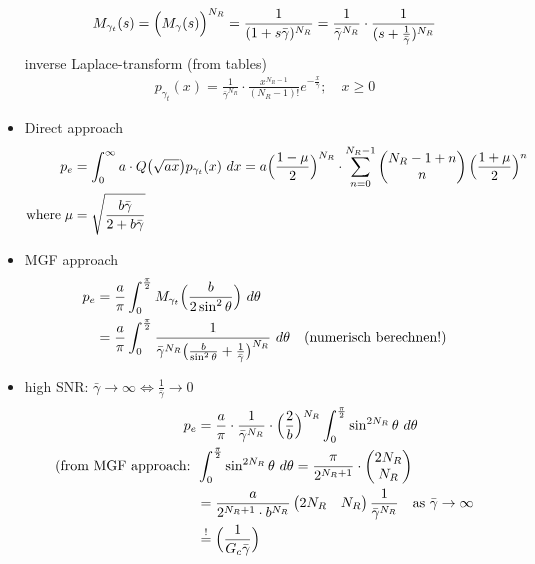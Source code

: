 \documentclass[a4paper, 10pt]{article}
\begin{document}
\begin{itemize}
			\begin{align*}
				M_{\gamma _t}(s) = \Bigl (M_\gamma (s)\Bigr )^{N_R} = \frac{1}{(1 + s\bar{\gamma})^{N_R}} = \frac{1}{\bar{\gamma}^{N_R}}\cdot \frac{1}{(s + \frac{1}{\bar{\gamma}})^{N_R}}
			\end{align*}
			inverse Laplace-transform (from tables)
			\begin{align*}
				p_{\gamma _t}(x) = \frac{1}{\bar{\gamma}^{N_R}}\cdot \frac{x^{N_R-1}}{(N_R - 1)!}e^{-\frac{x}{\bar{\gamma}}};\quad x\geq 0
			\end{align*}
	\item Direct approach 
		\begin{align*}
			p_e &= \int_{0}^{\infty}a\cdot Q\bigl (\sqrt{ax} \bigr )p_{\gamma _t}(x)~dx = a\Bigl (\frac{1 - \mu}{2}\Bigr )^{N_R} \cdot \sum_{n = 0}^{N_R - 1}\begin{pmatrix} N_R - 1 + n \\ n\end{pmatrix}\Bigl (\frac{1 + \mu}{2}\Bigr )^n \\ \text{where}\; \mu &= \sqrt{\frac{b\bar{\gamma}}{2 + b\bar{\gamma}}}
		\end{align*}
		\item MGF approach
			\begin{align*}
				p_e &= \frac{a}{\pi}\int_{0}^{\frac{\pi}{2}}M_{\gamma _t}\Bigl ( \frac{b}{2\sin ^2\theta}\Bigr )~d\theta \\
				&= \frac{a}{\pi}\int_{0}^{\frac{\pi}{2}}\frac{1}{\bar{\gamma}^{N_R}\bigl (\frac{b}{\sin ^2\theta} + \frac{1}{\bar{\gamma}}\bigr )^{N_R}}~d\theta \quad \text{(numerisch berechnen!)}
			\end{align*}
			\item high SNR: \quad \begin{math}\bar{\gamma}\rightarrow \infty \Longleftrightarrow \frac{1}{\bar{\gamma}}\rightarrow 0 \end{math}
	\begin{align*}
				p_e &= \frac{a}{\pi}\cdot\frac{1}{\bar{\gamma}^{N_R}}\cdot \Bigl (\frac{2}{b}\Bigr )^{N_R}\int_{0}^{\frac{\pi}{2}}\sin ^{2N_R}\theta ~d\theta \\
				 (\text{from MGF approach: }  &\int_{0}^{\frac{\pi}{2}}\sin ^{2N_R}\theta ~d\theta = \frac{\pi}{2^{N_R + 1}}\cdot \begin{pmatrix} 2N_R \\ N_R \end{pmatrix}\\ &= \frac{a}{2^{N_R+1}\cdot b^{N_R}}\begin{pmatrix}2N_R & N_R\end{pmatrix}\frac{1}{\bar{\gamma}^{N_R}}\quad \text{as } \bar{\gamma} \rightarrow \infty \\ &\stackrel{!}{=} \Bigl (\frac{1}{G_c\bar{\gamma}}\Bigr )\\

\end{align*}
\end{itemize}
\end{document}
